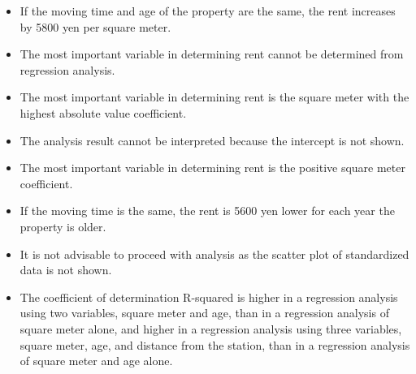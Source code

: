 \begin{itemize}
	\item If the moving time and age of the property are the same, the rent increases by 5800 yen per square meter.
	\item The most important variable in determining rent cannot be determined from regression analysis.
	\item The most important variable in determining rent is the square meter with the highest absolute value coefficient.
	\item The analysis result cannot be interpreted because the intercept is not shown.
	\item The most important variable in determining rent is the positive square meter coefficient.
	\item If the moving time is the same, the rent is 5600 yen lower for each year the property is older.
	\item It is not advisable to proceed with analysis as the scatter plot of standardized data is not shown.
	\item The coefficient of determination R-squared is higher in a regression analysis using two variables, square meter and age, than in a regression analysis of square meter alone, and higher in a regression analysis using three variables, square meter, age, and distance from the station, than in a regression analysis of square meter and age alone.
\end{itemize}
